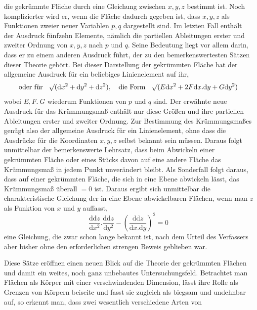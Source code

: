 %
die gekrümmte Fläche durch eine Gleichung zwischen \(x,y,z\) bestimmt ist. Noch komplizierter wird er, wenn die Fläche dadurch gegeben ist, dass \(x,y,z\) als Funktionen zweier neuer Variablen \(p,q\) dargestellt sind. Im letzten Fall enthält der Ausdruck fünfzehn Elemente, nämlich die partiellen Ableitungen erster und zweiter Ordnung von \(x,y,z\) nach \(p\) und \(q\). Seine Bedeutung liegt vor allem darin, dass er zu einem anderen Ausdruck führt, der zu den bemerkenswertesten Sätzen dieser Theorie gehört. Bei dieser Darstellung der gekrümmten Fläche hat der allgemeine Ausdruck für ein beliebiges Linienelement auf ihr,
\[
\text{oder für}\quad\mathord{{}^{}\!\surd}(\mathrm{d}x^2+\mathrm{d}y^2+\mathrm{d}z^2),\quad\text{die Form}\quad\mathord{{}^{}\!\surd}(E\mathrm{d}x^2+2F\mathrm{d}x\mathord{.}\mathrm{d}y+G\mathrm{d}y^2)
\]
wobei \(E,F.\ G\) wiederum Funktionen von \(p\) und \(q\) sind. Der erwähnte neue Ausdruck für das Krümmungsmaß enthält nur diese Größen und ihre partiellen Ableitungen erster und zweiter Ordnung. Zur Bestimmung des Krümmungsmaßes genügt also der allgemeine Ausdruck für ein Linienelement, ohne dass die Ausdrücke für die Koordinaten \(x,y,z\) selbst bekannt sein müssen. Daraus folgt unmittelbar der bemerkenswerte Lehrsatz, dass beim Abwickeln einer gekrümmten Fläche oder eines Stücks davon auf eine andere Fläche das Krümmungsmaß in jedem Punkt unverändert bleibt. Als Sonderfall folgt daraus, dass auf einer gekrümmten Fläche, die sich in eine Ebene abwickeln lässt, das Krümmungsmaß überall \(=0\) ist. Daraus ergibt sich unmittelbar die charakteristische Gleichung der in eine Ebene abwickelbaren Flächen, wenn man \(z\) als Funktion von \(x\) und \(y\) auffasst,
\[
\frac{\mathrm{dd}z}{\mathrm{d}x^2}\mathord{.}\frac{\mathrm{dd}z}{\mathrm{d}y^2}-(\frac{\mathrm{dd}z}{\mathrm{d}x\mathord{.}\mathrm{d}y})^2=0
\]
eine Gleichung, die zwar schon lange bekannt ist, nach dem Urteil des Verfassers aber bisher ohne den erforderlichen strengen Beweis geblieben war.

Diese Sätze eröffnen einen neuen Blick auf die Theorie der gekrümmten Flächen und damit ein weites, noch ganz unbebautes Untersuchungsfeld. Betrachtet man Flächen als Körper mit einer verschwindenden Dimension, lässt ihre Rolle als Grenzen von Körpern beiseite und fasst sie zugleich als biegsam und undehnbar auf, so erkennt man, dass zwei wesentlich verschiedene Arten von
